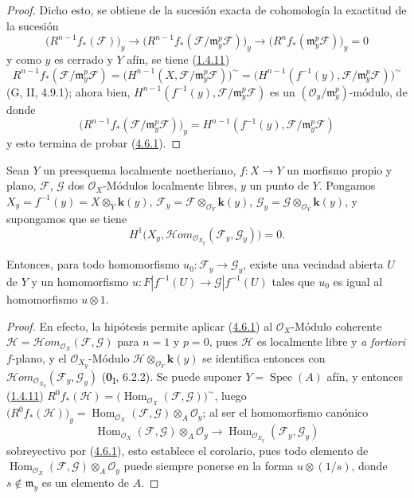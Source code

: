\begin{proof}
Dicho esto, se obtiene de la sucesión exacta de cohomología la exactitud de la
sucesión
\[
\bigl(R^{n-1}f_*(\mathcal F)\bigr)_y
\longrightarrow
\bigl(R^{n-1}f_*(\mathcal F/\mathfrak m_y^p\mathcal F)\bigr)_y
\longrightarrow
\bigl(R^nf_*(\mathfrak m_y^p\mathcal F)\bigr)_y=0
\]
y como $y$ es cerrado y $Y$ afín, se tiene (\hyperref[III.1.4.11-fr]{1.4.11})
\[
R^{n-1}f_*(\mathcal F/\mathfrak m_y^p\mathcal F)
=\bigl(H^{n-1}(X,\mathcal F/\mathfrak m_y^p\mathcal F)\bigr)^\sim
=\bigl(H^{n-1}(f^{-1}(y),
\mathcal F/\mathfrak m_y^p\mathcal F)\bigr)^\sim
\]
(G, II, 4.9.1); ahora bien,
$H^{n-1}(f^{-1}(y),\mathcal F/\mathfrak m_y^p\mathcal F)$ es un
$(\mathcal O_y/\mathfrak m_y^p)$-módulo, de donde
\[
\bigl(R^{n-1}f_*(\mathcal F/\mathfrak m_y^p\mathcal F)\bigr)_y
=H^{n-1}(f^{-1}(y),\mathcal F/\mathfrak m_y^p\mathcal F)
\]
y esto termina de probar (\hyperref[III.4.6.1-fr]{4.6.1}).
\end{proof}

\begin{corollary}[4.6.2]
\label{III.4.6.2-fr}
Sean $Y$ un preesquema localmente noetheriano, $f:X\to Y$ un morfismo propio
y plano, $\mathcal F$, $\mathcal G$ dos $\mathcal O_X$-Módulos localmente
libres, $y$ un punto de $Y$. Pongamos
$X_y=f^{-1}(y)=X\otimes_Y\boldsymbol{k}(y)$,
$\mathcal F_y=\mathcal F\otimes_{\mathcal O_Y}\boldsymbol{k}(y)$,
$\mathcal G_y=\mathcal G\otimes_{\mathcal O_Y}\boldsymbol{k}(y)$,
y supongamos que se tiene
\[
\label{III.4.6.2.1-fr}
H^1\bigl(X_y,
\mathcal{H}\!om_{\mathcal O_{X_y}}(\mathcal F_y,\mathcal G_y)\bigr)=0.
\tag{4.6.2.1}
\]

Entonces, para todo homomorfismo $u_0:\mathcal F_y\to\mathcal G_y$, existe
una vecindad abierta $U$ de $Y$ y un homomorfismo
$u:F|f^{-1}(U)\longrightarrow\mathcal G|f^{-1}(U)$
tales que $u_0$ es igual al homomorfismo $u\otimes1$.
\end{corollary}

\begin{proof}
En efecto, la hipótesis permite aplicar (\hyperref[III.4.6.1-fr]{4.6.1}) al
$\mathcal O_X$-Módulo coherente
$\mathcal H=\mathcal{H}\!om_{\mathcal O_X}(\mathcal F,\mathcal G)$ para
$n=1$ y $p=0$, pues $\mathcal H$ es localmente libre y \emph{a fortiori}
$f$-plano, y el $\mathcal O_{X_y}$-Módulo
$\mathcal H\otimes_{\mathcal O_Y}\boldsymbol{k}(y)$ se identifica entonces con
$\mathcal{H}\!om_{\mathcal O_{X_y}}(\mathcal F_y,\mathcal G_y)$
(\textbf{0}\textsubscript{I}, 6.2.2). Se puede suponer $Y=\operatorname{Spec}(A)$
afín, y entonces (\hyperref[III.1.4.11-fr]{1.4.11})
$R^0f_*(\mathcal H)=
\bigl(\operatorname{Hom}_{\mathcal O_X}(\mathcal F,\mathcal G)\bigr)^\sim$,
luego
$\bigl(R^0f_*(\mathcal H)\bigr)_y
=\operatorname{Hom}_{\mathcal O_X}(\mathcal F,\mathcal G)
\otimes_A\mathcal O_y$;
al ser el homomorfismo canónico
\[
\operatorname{Hom}_{\mathcal O_X}(\mathcal F,\mathcal G)
\otimes_A\mathcal O_y
\longrightarrow
\operatorname{Hom}_{\mathcal O_{X_y}}(\mathcal F_y,\mathcal G_y)
\]
sobreyectivo por (\hyperref[III.4.6.1-fr]{4.6.1}), esto establece el
corolario, pues todo elemento de
$\operatorname{Hom}_{\mathcal O_X}(\mathcal F,\mathcal G)
\otimes_A\mathcal O_y$ puede siempre ponerse en la forma
$u\otimes(1/s)$, donde $s\notin\mathfrak m_y$ es un elemento de $A$.
\end{proof}

